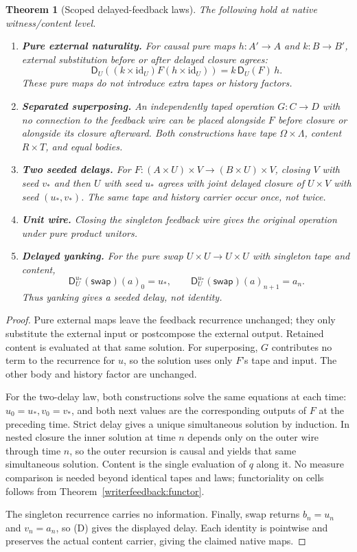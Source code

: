 \documentclass[11pt]{article}
\newtheorem{theorem}{Theorem}[section]
\begin{document}
\begin{theorem}[Scoped delayed-feedback laws]\label{writerfeedback:laws}
The following hold at native witness/content level.
\begin{enumerate}
\item \textbf{Pure external naturality.} For causal pure maps $h:A'\to A$ and $k:B\to B'$, external substitution before or after delayed closure agrees:
\[
 \mathsf D_U((k\times\mathrm{id}_U)F(h\times\mathrm{id}_U))
 =k\,\mathsf D_U(F)\,h.
\]
These pure maps do not introduce extra tapes or history factors.
\item \textbf{Separated superposing.} An independently taped operation $G:C\to D$ with no connection to the feedback wire can be placed alongside $F$ before closure or alongside its closure afterward. Both constructions have tape $\Omega\times\Lambda$, content $R\times T$, and equal bodies.
\item \textbf{Two seeded delays.} For $F:(A\times U)\times V\to(B\times U)\times V$, closing $V$ with seed $v_*$ and then $U$ with seed $u_*$ agrees with joint delayed closure of $U\times V$ with seed $(u_*,v_*)$. The same tape and history carrier occur once, not twice.
\item \textbf{Unit wire.} Closing the singleton feedback wire gives the original operation under pure product unitors.
\item \textbf{Delayed yanking.} For the pure swap $U\times U\to U\times U$ with singleton tape and content,
\[
 \mathsf D_U^{u_*}(\mathsf{swap})(a)_0=u_*,\qquad
 \mathsf D_U^{u_*}(\mathsf{swap})(a)_{n+1}=a_n.
\]
Thus yanking gives a seeded delay, not identity.
\end{enumerate}
\end{theorem}
\begin{proof}
Pure external maps leave the feedback recurrence unchanged; they only substitute the external input or postcompose the external output. Retained content is evaluated at that same solution. For superposing, $G$ contributes no term to the recurrence for $u$, so the solution uses only $F$'s tape and input. The other body and history factor are unchanged.

For the two-delay law, both constructions solve the same equations at each time: $u_0=u_*,v_0=v_*$, and both next values are the corresponding outputs of $F$ at the preceding time. Strict delay gives a unique simultaneous solution by induction. In nested closure the inner solution at time $n$ depends only on the outer wire through time $n$, so the outer recursion is causal and yields that same simultaneous solution. Content is the single evaluation of $q$ along it. No measure comparison is needed beyond identical tapes and laws; functoriality on cells follows from Theorem~\ref{writerfeedback:functor}.

The singleton recurrence carries no information. Finally, swap returns $b_n=u_n$ and $v_n=a_n$, so (D) gives the displayed delay. Each identity is pointwise and preserves the actual content carrier, giving the claimed native maps.
\end{proof}
\end{document}
